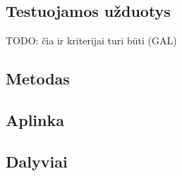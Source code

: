 \subsection{Testuojamos užduotys}
TODO: čia ir kriterijai turi būti (GAL)

\subsection{Metodas}

\subsection{Aplinka}

\subsection{Dalyviai}